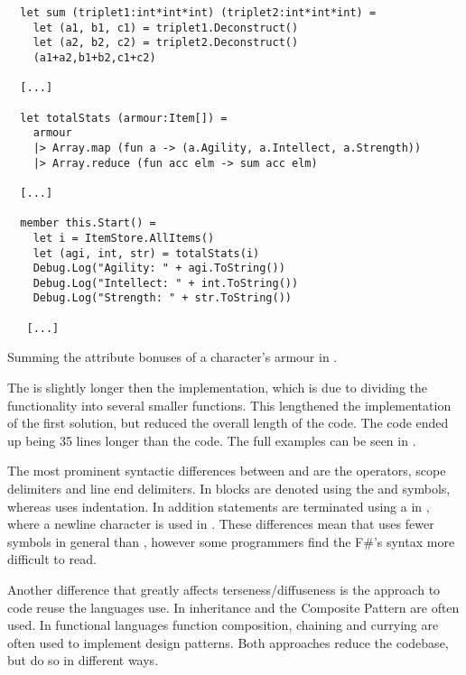 \begin{listing}[H]
  \begin{verbatim}
  let sum (triplet1:int*int*int) (triplet2:int*int*int) =
    let (a1, b1, c1) = triplet1.Deconstruct()
    let (a2, b2, c2) = triplet2.Deconstruct()
    (a1+a2,b1+b2,c1+c2)
  
  [...]
  
  let totalStats (armour:Item[]) =
    armour
    |> Array.map (fun a -> (a.Agility, a.Intellect, a.Strength))
    |> Array.reduce (fun acc elm -> sum acc elm)
  
  [...]
  
  member this.Start() =
    let i = ItemStore.AllItems()
    let (agi, int, str) = totalStats(i)
    Debug.Log("Agility: " + agi.ToString())
    Debug.Log("Intellect: " + int.ToString())
    Debug.Log("Strength: " + str.ToString())
  
   [...]
  \end{verbatim}
  \caption{Summing the attribute bonuses of a character's armour in \fs.}
  \label{lst:fs-armour}
  \end{listing}

The \fs is slightly longer then the \cs implementation, which is due to dividing the functionality into several smaller functions. This lengthened the implementation of the first solution, but reduced the overall length of the code. The \cs code ended up being 35 lines longer than the \fs code. The full examples can be seen in .

The most prominent syntactic differences between \cs and \fs are the operators, scope delimiters and line end delimiters. In \cs blocks are denoted using the \m{\{} and \m{\}} symbols, whereas \fs uses indentation. In addition statements are terminated using a \m{;} in \cs, where a newline character is used in \fs. These differences mean that \fs uses fewer symbols in general than \cs, however some programmers find the F\#'s syntax more difficult to read\cite{fsharp:light:love}.

Another difference that greatly affects terseness/diffuseness is the approach to code reuse the languages use. In \cs inheritance and the Composite Pattern\cite{composite:pattern} are often used\cite{csharp:composite:pattern}. In functional languages function composition, chaining and currying are often used to implement design patterns\cite{functional:design:patterns}. Both approaches reduce the codebase, but do so in different ways.
